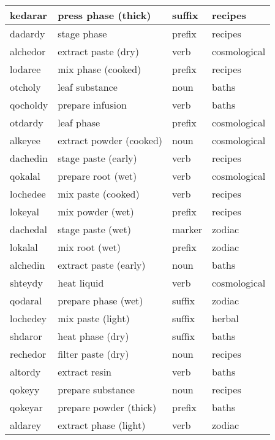 \documentclass[12pt]{article}
\begin{document}
\begin{longtable}{|l|l|l|l|}
kedarar & press phase (thick) & suffix & recipes \\ \hline
dadardy & stage phase & prefix & recipes \\ \hline
alchedor & extract paste (dry) & verb & cosmological \\ \hline
lodaree & mix phase (cooked) & prefix & recipes \\ \hline
otcholy & leaf substance & noun & baths \\ \hline
qocholdy & prepare infusion & verb & baths \\ \hline
otdardy & leaf phase & prefix & cosmological \\ \hline
alkeyee & extract powder (cooked) & noun & cosmological \\ \hline
dachedin & stage paste (early) & verb & recipes \\ \hline
qokalal & prepare root (wet) & verb & cosmological \\ \hline
lochedee & mix paste (cooked) & verb & recipes \\ \hline
lokeyal & mix powder (wet) & prefix & recipes \\ \hline
dachedal & stage paste (wet) & marker & zodiac \\ \hline
lokalal & mix root (wet) & prefix & zodiac \\ \hline
alchedin & extract paste (early) & noun & baths \\ \hline
shteydy & heat liquid & verb & cosmological \\ \hline
qodaral & prepare phase (wet) & suffix & zodiac \\ \hline
lochedey & mix paste (light) & suffix & herbal \\ \hline
shdaror & heat phase (dry) & suffix & baths \\ \hline
rechedor & filter paste (dry) & noun & recipes \\ \hline
altordy & extract resin & verb & baths \\ \hline
qokeyy & prepare substance & noun & recipes \\ \hline
qokeyar & prepare powder (thick) & prefix & baths \\ \hline
aldarey & extract phase (light) & verb & zodiac \\ \hline
\end{longtable}
\end{document}
